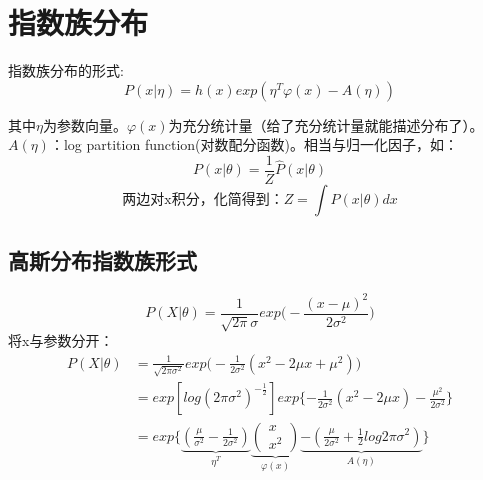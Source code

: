 \documentclass[UTF8]{ctexart} %
\begin{document}
	\section{指数族分布}
		\begin{figure}[H]
		\end{figure}
		指数族分布的形式:
		\[P(x|\eta) = h(x)exp(\eta^T\varphi(x)-A(\eta))\]
		
		其中$\eta$为参数向量。$\varphi(x)$为充分统计量（给了充分统计量就能描述分布了）。
		$A(\eta)$：log partition function(对数配分函数)。相当与归一化因子，如：
		\[P(x|\theta) = \frac{1}{Z}\hat{P}(x|\theta)\]
		\[\text{两边对x积分，化简得到：}Z = \int \hat{P}(x|\theta)dx \]
		
		\subsection{高斯分布指数族形式}
			\[P(X|\theta) = \frac{1}{\sqrt{2\pi }\sigma}exp\big(-\frac{(x-\mu)^2}{2\sigma^2}\big)\]
			将x与参数分开：
			\[
			\begin{aligned}
			P(X|\theta) &= \frac{1}{\sqrt{2\pi\sigma^2 }}exp\big(-\frac{1}{2\sigma^2}(x^2-2\mu x+\mu^2)\big)\\
			&= exp[log(2\pi\sigma^2)^{-\frac{1}{2}}]exp\{-\frac{1}{2\sigma^2}(x^2-2\mu x)-\frac{\mu^2}{2\sigma^2}\}\\
			& = exp\{ \underbrace{(\frac{\mu}{\sigma^2} - \frac{1}{2\sigma^2})}_{\eta^T} 
			\underbrace{\begin{pmatrix}	x\\x^2\end{pmatrix}}_{\varphi(x)}
			\underbrace{-(\frac{\mu}{2\sigma^2}+\frac{1}{2}log2\pi\sigma^2)}_{A(\eta)}\}
			\end{aligned}\]
			
\end{document}
